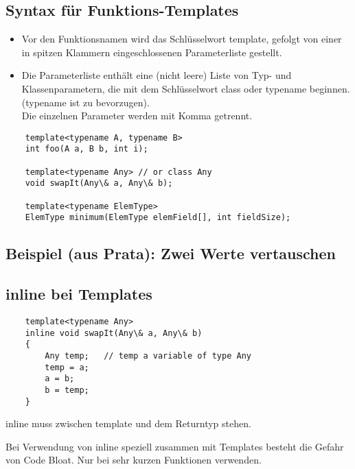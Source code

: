 \subsection{Syntax für Funktions-Templates}
\label{sec:Syntax für Funktions-Templates}
\begin{itemize}
	\item Vor den Funktionsnamen wird das Schlüsselwort template, gefolgt von einer in spitzen Klammern eingeschlossenen Parameterliste gestellt.
	\item Die Parameterliste enthält eine (nicht leere) Liste von Typ- und Klassenparametern, die mit dem Schlüsselwort class oder typename beginnen. (typename ist zu bevorzugen).\\
	Die einzelnen Parameter werden mit Komma getrennt.
\end{itemize}
\noindent
\begin{minipage}{\linewidth}
	\begin{lstlisting}
	template<typename A, typename B>
	int foo(A a, B b, int i);
	
	template<typename Any> // or class Any
	void swapIt(Any\& a, Any\& b);
	
	template<typename ElemType>
	ElemType minimum(ElemType elemField[], int fieldSize);
	\end{lstlisting}
\end{minipage}

\subsection{Beispiel (aus Prata): Zwei Werte vertauschen}
\label{sec:Beispiel (aus Prata): Zwei Werte vertauschen}


\subsection{inline bei Templates}
\label{sec:inline bei Templates}
\noindent
\begin{minipage}{\linewidth}
	\begin{lstlisting}
	template<typename Any>
	inline void swapIt(Any\& a, Any\& b)
	{
		Any temp;	// temp a variable of type Any
		temp = a;
		a = b;
		b = temp;
	}
	\end{lstlisting}
\end{minipage}
inline muss zwischen template und dem Returntyp stehen.
\begin{achtung}
Bei Verwendung von inline speziell zusammen mit Templates besteht die Gefahr von Code Bloat. Nur bei sehr kurzen Funktionen verwenden.	
\end{achtung}

